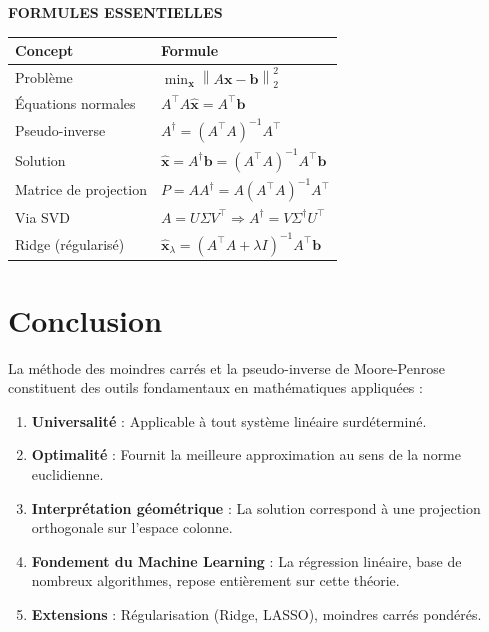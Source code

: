\documentclass[12pt,a4paper]{article}
\newcommand{\norm}[1]{\left\| #1 \right\|}
\newcommand{\T}{^\top}
\newcommand{\pinv}{^\dagger}
\begin{document}
\begin{resultatbox}
\begin{center}
\textbf{\textcolor{bleu}{FORMULES ESSENTIELLES}}
\end{center}

\vspace{0.5cm}

\renewcommand{\arraystretch}{1.8}
\begin{tabular}{|p{4.5cm}|p{8cm}|}
\hline
\textbf{Concept} & \textbf{Formule} \\
\hline
Problème & $\displaystyle \min_{\mathbf{x}} \norm{A\mathbf{x} - \mathbf{b}}_2^2$ \\
\hline
Équations normales & $A\T A \hat{\mathbf{x}} = A\T \mathbf{b}$ \\
\hline
Pseudo-inverse & $A\pinv = (A\T A)^{-1} A\T$ \\
\hline
Solution & $\hat{\mathbf{x}} = A\pinv \mathbf{b} = (A\T A)^{-1} A\T \mathbf{b}$ \\
\hline
Matrice de projection & $P = A A\pinv = A(A\T A)^{-1} A\T$ \\
\hline
Via SVD & $A = U\Sigma V\T \Rightarrow A\pinv = V \Sigma\pinv U\T$ \\
\hline
Ridge (régularisé) & $\hat{\mathbf{x}}_\lambda = (A\T A + \lambda I)^{-1} A\T \mathbf{b}$ \\
\hline
\end{tabular}
\end{resultatbox}

\section{Conclusion}

La méthode des moindres carrés et la pseudo-inverse de Moore-Penrose constituent des outils fondamentaux en mathématiques appliquées :

\begin{enumerate}
    \item \textbf{Universalité} : Applicable à tout système linéaire surdéterminé.

    \item \textbf{Optimalité} : Fournit la meilleure approximation au sens de la norme euclidienne.

    \item \textbf{Interprétation géométrique} : La solution correspond à une projection orthogonale sur l'espace colonne.

    \item \textbf{Fondement du Machine Learning} : La régression linéaire, base de nombreux algorithmes, repose entièrement sur cette théorie.

    \item \textbf{Extensions} : Régularisation (Ridge, LASSO), moindres carrés pondérés.
\end{enumerate}
\end{document}

